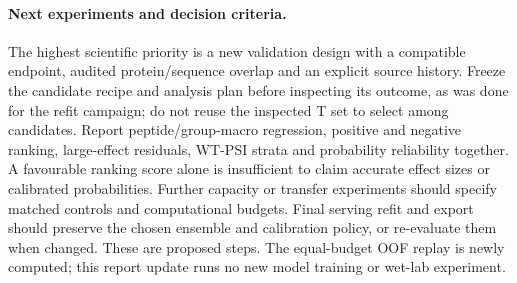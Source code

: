 \paragraph{Next experiments and decision criteria.}
The highest scientific priority is a new validation design with a compatible endpoint, audited
protein/sequence overlap and an explicit source history. Freeze the candidate recipe and analysis
plan before inspecting its outcome, as was done for the refit campaign; do not reuse the inspected
T set to select among candidates.
Report peptide/group-macro regression, positive and negative ranking, large-effect residuals,
WT-PSI strata and probability reliability together. A favourable ranking score alone is insufficient
to claim accurate effect sizes or calibrated probabilities. Further capacity or transfer experiments
should specify matched controls and computational budgets. Final serving refit and export should
preserve the chosen ensemble and calibration policy, or re-evaluate them when changed. These are
proposed steps. The equal-budget OOF replay is newly computed; this report update runs no new
model training or wet-lab experiment.
